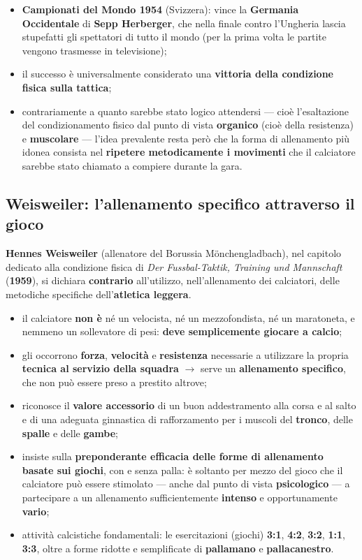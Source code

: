 \begin{itemize}
  \item \textbf{Campionati del Mondo 1954} (Svizzera): vince la \textbf{Germania Occidentale} di
    \textbf{Sepp Herberger}, che nella finale contro l'Ungheria lascia stupefatti gli spettatori di
    tutto il mondo (per la prima volta le partite vengono trasmesse in televisione);
  \item il successo è universalmente considerato una \textbf{vittoria della condizione fisica sulla
    tattica};
  \item contrariamente a quanto sarebbe stato logico attendersi --- cioè l'esaltazione del
    condizionamento fisico dal punto di vista \textbf{organico} (cioè della resistenza) e
    \textbf{muscolare} --- l'idea prevalente
    resta però che la forma di allenamento più idonea consista nel \textbf{ripetere metodicamente i
    movimenti} che il calciatore sarebbe stato chiamato a compiere durante la gara.
\end{itemize}

\subsection{Weisweiler: l'allenamento specifico attraverso il gioco}

\textbf{Hennes Weisweiler} (allenatore del Borussia Mönchengladbach), nel capitolo dedicato alla
condizione fisica di \textit{Der Fussbal-Taktik, Training und Mannschaft} (\textbf{1959}), si
dichiara \textbf{contrario} all'utilizzo, nell'allenamento dei calciatori, delle metodiche
specifiche dell'\textbf{atletica leggera}.

\begin{itemize}
  \item il calciatore \textbf{non è} né un velocista, né un mezzofondista, né un maratoneta, e
    nemmeno un sollevatore di pesi: \textbf{deve semplicemente giocare a calcio};
  \item gli occorrono \textbf{forza}, \textbf{velocità} e \textbf{resistenza} necessarie a
    utilizzare la propria \textbf{tecnica al servizio della squadra} $\rightarrow$ serve un
    \textbf{allenamento specifico}, che non può essere preso a prestito altrove;
  \item riconosce il \textbf{valore accessorio} di un buon addestramento alla corsa e al salto e di
    una adeguata ginnastica di rafforzamento per i muscoli del \textbf{tronco}, delle
    \textbf{spalle} e delle \textbf{gambe};
  \item insiste sulla \textbf{preponderante efficacia delle forme di allenamento basate sui
    giochi}, con e senza palla: è soltanto per mezzo del gioco che il calciatore può essere
    stimolato --- anche dal punto di vista \textbf{psicologico} --- a partecipare a un allenamento
    sufficientemente \textbf{intenso} e opportunamente \textbf{vario};
  \item attività calcistiche fondamentali: le esercitazioni (giochi) \textbf{3:1}, \textbf{4:2},
    \textbf{3:2}, \textbf{1:1}, \textbf{3:3}, oltre a forme ridotte e semplificate di
    \textbf{pallamano} e \textbf{pallacanestro}.
\end{itemize}

